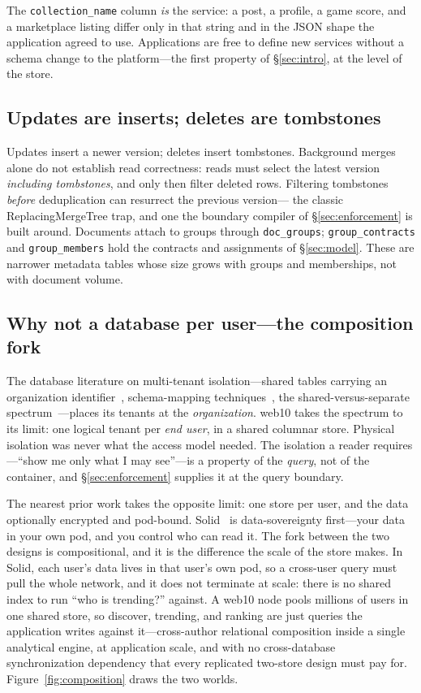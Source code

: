 \documentclass[sigconf, nonacm]{acmart}
\begin{document}
The \texttt{collection\_name} column \emph{is} the service: a post, a
profile, a game score, and a marketplace listing differ only in that string
and in the JSON shape the application agreed to use. Applications are free
to define new services without a schema change to the platform---the first
property of \S\ref{sec:intro}, at the level of the store.

\subsection{Updates are inserts; deletes are tombstones}

Updates insert a newer version; deletes insert tombstones. Background merges
alone do not establish read correctness: reads must select the latest version
\emph{including tombstones}, and only then filter deleted rows. Filtering
tombstones \emph{before} deduplication can resurrect the previous version---
the classic ReplacingMergeTree trap, and one the boundary compiler of
\S\ref{sec:enforcement} is built around. Documents attach to groups through
\texttt{doc\_groups}; \texttt{group\_contracts} and \texttt{group\_members}
hold the contracts and assignments of \S\ref{sec:model}. These are narrower
metadata tables whose size grows with groups and memberships, not with
document volume.

\subsection{Why not a database per user---the composition fork}

The database literature on multi-tenant isolation---shared tables carrying
an organization identifier~\cite{force2009}, schema-mapping
techniques~\cite{aulbach2008}, the shared-versus-separate
spectrum~\cite{jacobs2007}---places its tenants at the \emph{organization}.
web10 takes the spectrum to its limit: one logical tenant per \emph{end
user}, in a shared columnar store. Physical isolation was never what the
access model needed. The isolation a reader requires---``show me only what I
may see''---is a property of the \emph{query}, not of the container, and
\S\ref{sec:enforcement} supplies it at the query boundary.

The nearest prior work takes the opposite limit: one store per user, and the
data optionally encrypted and pod-bound. Solid~\cite{solid2016} is
data-sovereignty first---your data in your own pod, and you control who can
read it. The fork between the two designs is compositional, and it is the
difference the scale of the store makes. In Solid, each user's data lives in
that user's own pod, so a cross-user query must pull the whole network, and
it does not terminate at scale: there is no shared index to run ``who is
trending?'' against. A web10 node pools millions of users in one shared
store, so discover, trending, and ranking are just queries the application
writes against it---cross-author relational composition inside a single
analytical engine, at application scale, and with no cross-database
synchronization dependency that every replicated two-store design must pay
for. Figure~\ref{fig:composition} draws the two worlds.
\end{document}
